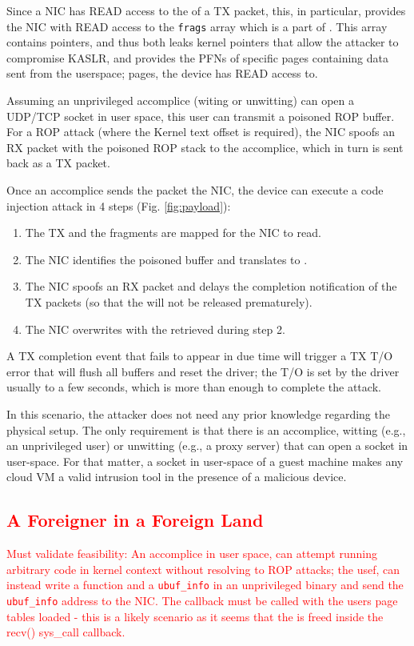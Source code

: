 \smallskip
Since a NIC has READ access to the \shinfo{} of a TX packet, this, in particular, provides the NIC with READ access to the \texttt{frags} array which is a part of \shinfo{}. This array contains \page{} pointers, and thus both leaks kernel pointers that allow the attacker to compromise KASLR, and provides the PFNs of specific pages containing data sent from the userspace; pages, the device has READ access to.

\smallskip
Assuming an unprivileged accomplice (witing or unwitting) can open a UDP/TCP socket in user space, this user can transmit a poisoned ROP buffer. For a ROP attack (where the Kernel text offset is required), the NIC spoofs an RX packet with the poisoned ROP stack to the accomplice, which in turn is sent back as a TX packet. 

Once an accomplice sends the packet the NIC, the device can execute a code injection attack in 4 steps (Fig. \ref{fig:payload}):
\begin{enumerate}
    \item The TX \data{} and the fragments are mapped for the NIC to read.
    \item The NIC identifies the poisoned buffer and translates \page{} to \kva.
    \item The NIC spoofs an RX packet and delays the completion notification of the TX packets (so that the \mabaf will not be released prematurely).
    \item The NIC overwrites \shinfo{} with the \kva{} retrieved during step 2. 
\end{enumerate}

A TX completion event that fails to appear in due time will trigger a TX T/O error that will flush all buffers and reset the driver; the T/O is set by the driver usually to a few seconds, which is more than enough to complete the attack.
 
In this scenario, the attacker does not need any prior knowledge regarding the physical setup. The only requirement is that there is an accomplice, witting (e.g., an unprivileged user) or unwitting (e.g., a proxy server) that can open a socket in user-space. For that matter, a socket in user-space of a guest machine makes any cloud VM a valid intrusion tool in the presence of a malicious device.

\textcolor{red}{
\subsection{A Foreigner in a Foreign Land}
Must validate feasibility: An accomplice in user space, can attempt running arbitrary code in kernel context without resolving to ROP attacks; the usef, can instead write a function and a \texttt{ubuf\_info} in an unprivileged binary and send the \texttt{ubuf\_info} address to the NIC. The \shinfo callback must be called with the users page tables loaded - this is a likely scenario as it seems that the \skb is freed inside the recv() sys\_call callback.}

